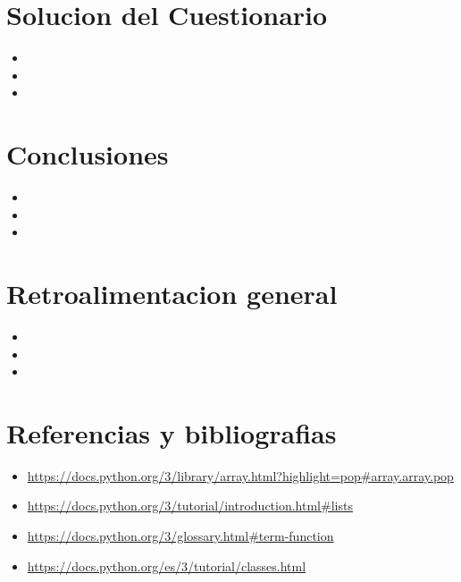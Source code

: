 \documentclass[]{article}
\begin{document}
    \section{Solucion del Cuestionario}
    	\begin{itemize}		
    		\item 
    		\item 
    		\item 
    	\end{itemize}
    \section{Conclusiones}
    	\begin{itemize}		
    		\item 
    		\item 
    		\item 
    	\end{itemize}
    \section{Retroalimentacion general}
    	\begin{itemize}		
    		\item 
    		\item 
    		\item 
    	\end{itemize}
    \section{Referencias y bibliografias}
    	\begin{itemize}		
    		\item \url{https://docs.python.org/3/library/array.html?highlight=pop#array.array.pop}
    		\item \url{https://docs.python.org/3/tutorial/introduction.html#lists}
    		\item 
            \url{https://docs.python.org/3/glossary.html#term-function}
            \item \url{https://docs.python.org/es/3/tutorial/classes.html}
    	\end{itemize}
     
\end{document}
